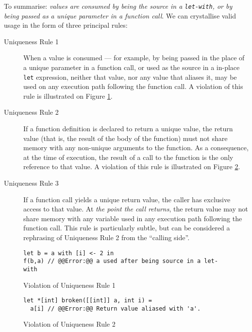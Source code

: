 \documentclass[oneside,11pt]{book}
\begin{document}
To summarise: \textit{values are consumed by being the source in a
  \texttt{let-with}, or by being passed as a \textit{unique} parameter
  in a function call}.  We can crystallise valid usage in the form of
three principal rules:

\begin{description}
\item[Uniqueness Rule 1] When a value is consumed --- for example, by
  being passed in the place of a unique parameter in a function call,
  or used as the source in a in-place \texttt{let} expression, neither
  that value, nor any value that aliases it, may be used on any
  execution path following the function call.  A violation of this
  rule is illustrated on Figure \ref{fig:uniqueness-rule-1-violation}.

\item[Uniqueness Rule 2] If a function definition is declared to
  return a unique value, the return value (that is, the result of the
  body of the function) must not share memory with any non-unique
  arguments to the function.  As a consequence, at the time of
  execution, the result of a call to the function is the only
  reference to that value.  A violation of this rule is illustrated on
  Figure \ref{fig:uniqueness-rule-2-violation}.

\item[Uniqueness Rule 3] If a function call yields a unique return
  value, the caller has exclusive access to that value.  At
  \textit{the point the call returns}, the return value may not share
  memory with any variable used in any execution path following the
  function call.  This rule is particularly subtle, but can be
  considered a rephrasing of Uniqueness Rule 2 from the ``calling
  side''.
\end{description}

\begin{figure}
\centering
\begin{lstlisting}
let b = a with [i] <- 2 in
f(b,a) // @@Error:@@ a used after being source in a let-with
\end{lstlisting}
\caption{Violation of Uniqueness Rule 1}
\label{fig:uniqueness-rule-1-violation}
\end{figure}

\begin{figure}
\centering
\begin{lstlisting}
let *[int] broken([[int]] a, int i) =
  a[i] // @@Error:@@ Return value aliased with 'a'.
\end{lstlisting}
\caption{Violation of Uniqueness Rule 2}
\label{fig:uniqueness-rule-2-violation}
\end{figure}
\end{document}
